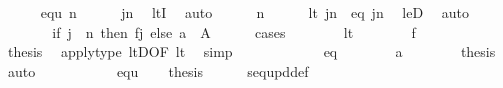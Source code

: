 \begin{isabellebody}
\ \ \ \ \isamarkupfalse%
\ equ\ {\isacartoucheopen}n{\isasymin}{\isacharunderscore}{\kern0pt}{\isacartoucheclose}\isanewline
\ \ \ \ \isamarkupfalse%
\ {\isachardoublequoteopen}j{\isasymle}n{\isachardoublequoteclose}\ \isamarkupfalse%
\ ltI\ \isamarkupfalse%
\ auto\isanewline
\ \ \ \ \isamarkupfalse%
\ {\isacartoucheopen}n{\isasymin}{\isacharunderscore}{\kern0pt}{\isacartoucheclose}\isanewline
\ \ \ \ \isamarkupfalse%
\ {\isacharparenleft}{\kern0pt}lt{\isacharparenright}{\kern0pt}\ {\isachardoublequoteopen}j{\isacharless}{\kern0pt}n{\isachardoublequoteclose}\ {\isacharbar}{\kern0pt}\ {\isacharparenleft}{\kern0pt}eq{\isacharparenright}{\kern0pt}\ {\isachardoublequoteopen}j{\isacharequal}{\kern0pt}n{\isachardoublequoteclose}\ \isamarkupfalse%
\ leD\ \isamarkupfalse%
\ auto\isanewline
\ \ \ \ \isamarkupfalse%
\ \isanewline
\ \ \ \ \isamarkupfalse%
\ {\isachardoublequoteopen}{\isacharparenleft}{\kern0pt}if\ j\ {\isacharless}{\kern0pt}\ n\ then\ f{\isacharbackquote}{\kern0pt}j\ else\ a{\isacharparenright}{\kern0pt}\ {\isasymin}\ A{\isachardoublequoteclose}\isanewline
\ \ \ \ \isamarkupfalse%
\ cases\isanewline
\ \ \ \ \ \ \isamarkupfalse%
\ lt\isanewline
\ \ \ \ \ \ \isamarkupfalse%
\ {\isacartoucheopen}f{\isasymin}{\isacharunderscore}{\kern0pt}{\isacartoucheclose}\ \isanewline
\ \ \ \ \ \ \isamarkupfalse%
\ {\isacharquery}{\kern0pt}thesis\ \isamarkupfalse%
\ apply{\isacharunderscore}{\kern0pt}type\ ltD{\isacharbrackleft}{\kern0pt}OF\ lt{\isacharbrackright}{\kern0pt}\ \isamarkupfalse%
\ simp\isanewline
\ \ \ \ \isamarkupfalse%
\isanewline
\ \ \ \ \ \ \isamarkupfalse%
\ eq\isanewline
\ \ \ \ \ \ \isamarkupfalse%
\ {\isacartoucheopen}a{\isasymin}{\isacharunderscore}{\kern0pt}{\isacartoucheclose}\isanewline
\ \ \ \ \ \ \isamarkupfalse%
\ {\isacharquery}{\kern0pt}thesis\ \isamarkupfalse%
\ auto\isanewline
\ \ \ \ \isamarkupfalse%
\isanewline
\ \ \isacommand{{\isacharbraceright}{\kern0pt}}\isamarkupfalse%
\isanewline
\ \ \isamarkupfalse%
\ equ\isanewline
\ \ \isamarkupfalse%
\ {\isacharquery}{\kern0pt}thesis\isanewline
\ \ \ \ \isamarkupfalse%
\ seq{\isacharunderscore}{\kern0pt}upd{\isacharunderscore}{\kern0pt}def\isanewline
\ \ \ \ \isamarkupfalse%

\end{isabellebody}
